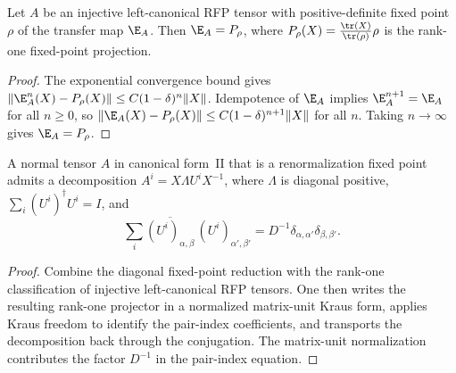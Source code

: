\begin{theorem}%
    \label{thm:transferMap_eq_fixedPointProj_of_isTransferIdempotent_injective}
    \leanok
    Let $A$ be an injective left-canonical RFP tensor with positive-definite
    fixed point $\rho$ of the transfer map $\E_A$. Then
    $\E_A = P_\rho$, where $P_\rho(X) = \frac{\tr(X)}{\tr(\rho)} \rho$
    is the rank-one fixed-point projection.
\end{theorem}
\begin{proof}\leanok
    The exponential convergence bound gives
    $\lVert \E_A^n(X) - P_\rho(X)\rVert \le C(1-\delta)^n\lVert X\rVert$.
    Idempotence of $\E_A$ implies $\E_A^{n+1} = \E_A$ for all $n \ge 0$,
    so $\lVert \E_A(X) - P_\rho(X)\rVert \le C(1-\delta)^{n+1}\lVert X\rVert$
    for all $n$. Taking $n \to \infty$ gives $\E_A = P_\rho$.
\end{proof}

\begin{theorem}%
    \label{thm:rfp_nt_structural_full}
    \leanok
    A normal tensor $A$ in canonical form~II that is a renormalization fixed
    point admits a decomposition $A^i = X \Lambda U^i X^{-1}$, where
    $\Lambda$ is diagonal positive, $\sum_i (U^i)^\dagger U^i=I$, and
    \[
        \sum_i \overline{(U^i)_{\alpha,\beta}}\,
        (U^i)_{\alpha',\beta'}
        =
        D^{-1}\delta_{\alpha,\alpha'}\delta_{\beta,\beta'} .
    \]
\end{theorem}
\begin{proof}\leanok
    Combine the diagonal fixed-point reduction with the rank-one
    classification of injective left-canonical RFP tensors. One then writes the
    resulting rank-one projector in a normalized matrix-unit Kraus form,
    applies Kraus freedom to identify the pair-index coefficients, and
    transports the decomposition back through the conjugation. The matrix-unit
    normalization contributes the factor $D^{-1}$ in the pair-index equation.
\end{proof}

